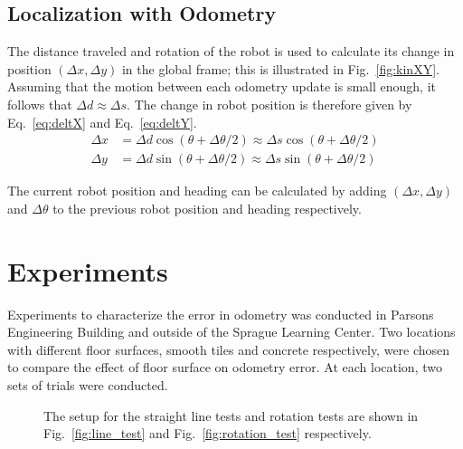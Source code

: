 \documentclass[conference]{../IEEEtran}
\begin{document}
\subsection{Localization with Odometry}

The distance traveled and rotation of the robot is used to calculate its change in position
$(\Delta x, \Delta y)$ in the global frame; this is illustrated in Fig.~\ref{fig:kinXY}.
Assuming that the motion between each odometry update is small enough,
it follows that $\Delta d \approx \Delta s$. The change in robot position is therefore given by Eq.~\ref{eq:deltX} and Eq.~\ref{eq:deltY}.
%
\begin{align}
  \Delta x &=
  \Delta d \cos{(\theta+\Delta\theta/2)} \approx \Delta s \cos{(\theta+\Delta\theta/2)}
  \label{eq:deltX}\\
  \Delta y &=
  \Delta d \sin{(\theta+\Delta\theta/2)} \approx \Delta s \sin{(\theta+\Delta\theta/2)}
  \label{eq:deltY}
\end{align}

The current robot position and heading can be calculated by adding $(\Delta x, \Delta y)$ and
$\Delta \theta$ to the previous robot position and heading respectively.

\section{Experiments}
Experiments to characterize the error in odometry was conducted in Parsons Engineering
Building and outside of the Sprague Learning Center. Two locations with different floor surfaces,
smooth tiles and concrete respectively, were chosen to compare the effect of floor surface on odometry error. At each location, two sets of trials were conducted.

\begin{figure}[h] \centering
  \caption{The setup for the straight line tests and rotation tests are shown in
           Fig.~\ref{fig:line_test} and Fig.~\ref{fig:rotation_test} respectively.}
\end{figure}
\end{document}
